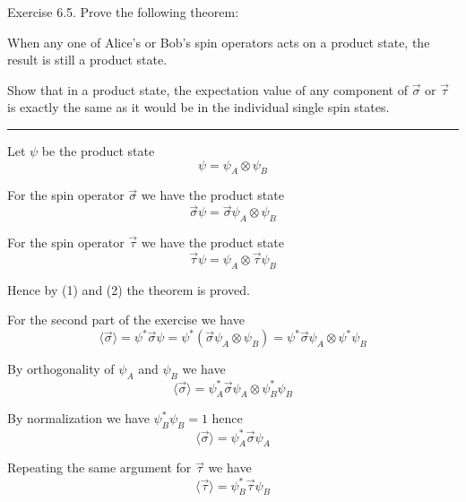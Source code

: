 \documentclass[12pt]{article}
\begin{document}
Exercise 6.5.
Prove the following theorem:

\bigskip
When any one of Alice's or Bob's spin operators acts on a
product state, the result is still a product state.

\bigskip
Show that in a product state, the expectation value of any
component of $\vec\sigma$ or $\vec\tau$ is exactly the same as it
would be in the individual single spin states.

\bigskip
\hrule

\bigskip
Let $\psi$ be the product state
\begin{equation*}
\psi=\psi_A\otimes\psi_B
\end{equation*}

For the spin operator $\vec\sigma$ we have the product state
\begin{equation*}
\vec\sigma\psi=\vec\sigma\psi_A\otimes\psi_B
\tag{1}
\end{equation*}

For the spin operator $\vec\tau$ we have the product state
\begin{equation*}
\vec\tau\psi=\psi_A\otimes\vec\tau\psi_B
\tag{2}
\end{equation*}

Hence by (1) and (2) the theorem is proved.

\bigskip
For the second part of the exercise we have
\begin{equation*}
\langle\vec\sigma\rangle
=\psi^*\vec\sigma\psi
=\psi^*(\vec\sigma\psi_A\otimes\psi_B)
=\psi^*\vec\sigma\psi_A\otimes\psi^*\psi_B
\end{equation*}

By orthogonality of $\psi_A$ and $\psi_B$ we have
\begin{equation*}
\langle\vec\sigma\rangle=\psi_A^*\vec\sigma\psi_A\otimes\psi_B^*\psi_B
\end{equation*}

By normalization we have $\psi_B^*\psi_B=1$ hence
\begin{equation*}
\langle\vec\sigma\rangle=\psi_A^*\vec\sigma\psi_A
\end{equation*}

Repeating the same argument for $\vec\tau$ we have
\begin{equation*}
\langle\vec\tau\rangle=\psi_B^*\vec\tau\psi_B
\end{equation*}
\end{document}
